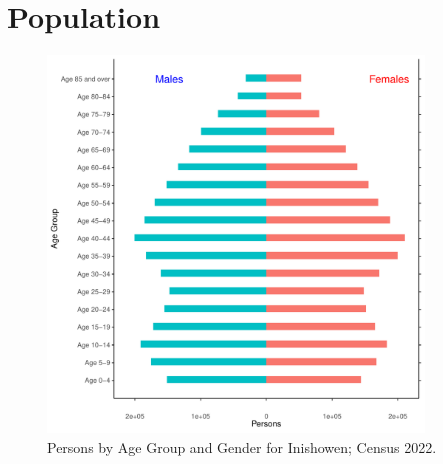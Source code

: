 \documentclass{article}
\begin{document}
\pagebreak

\section{Population} 
\label{sect:Pop}

\begin{figure}[h]
	\centering
	\includegraphics[width = 100mm]{../figures/PyramidPlot.pdf}
	\caption{Persons by Age Group and Gender for Inishowen; Census 2022.}
	\label{fig:2ae19629-1a6a-13a3-e055-000000000001}
	\end{figure}
\end{document}
